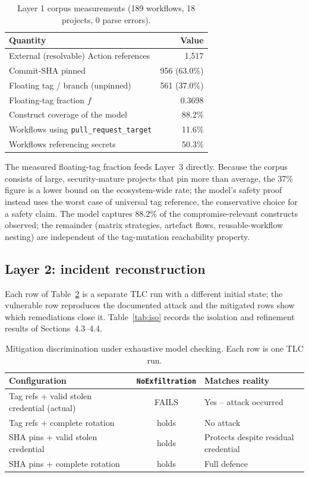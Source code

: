 \documentclass[letterpaper,twocolumn,10pt]{article}
\newcommand{\code}[1]{\texttt{\small #1}}
\begin{document}
\begin{table}[t]\centering
\caption{Layer 1 corpus measurements (189 workflows, 18 projects, 0 parse errors).}\label{tab:corpus}
\small
\begin{tabular}{@{}lr@{}}
\toprule
Quantity & Value\\
\midrule
External (resolvable) Action references & 1{,}517\\
Commit-SHA pinned & 956 (63.0\%)\\
Floating tag / branch (unpinned) & 561 (37.0\%)\\
Floating-tag fraction $f$ & 0.3698\\
Construct coverage of the model & 88.2\%\\
Workflows using \code{pull\_request\_target} & 11.6\%\\
Workflows referencing secrets & 50.3\%\\
\bottomrule
\end{tabular}
\end{table}

The measured floating-tag fraction feeds Layer~3 directly. Because the corpus consists of large, security-mature projects that pin more than average, the 37\% figure is a lower bound on the ecosystem-wide rate; the model's safety proof instead uses the worst case of universal tag reference, the conservative choice for a safety claim. The model captures 88.2\% of the compromise-relevant constructs observed; the remainder (matrix strategies, artefact flows, reusable-workflow nesting) are independent of the tag-mutation reachability property.

\subsection{Layer 2: incident reconstruction}
Each row of Table~\ref{tab:mitig} is a separate TLC run with a different initial state; the vulnerable row reproduces the documented attack and the mitigated rows show which remediations close it. Table~\ref{tab:iso} records the isolation and refinement results of Sections~4.3--4.4.

\begin{table}[t]\centering
\caption{Mitigation discrimination under exhaustive model checking. Each row is one TLC run.}\label{tab:mitig}
\begin{tabular}{@{}lcl@{}}
\toprule
Configuration & \code{NoExfiltration} & Matches reality\\
\midrule
Tag refs + valid stolen credential (actual) & FAILS & Yes -- attack occurred\\
Tag refs + complete rotation & holds & No attack\\
SHA pins + valid stolen credential & holds & Protects despite residual credential\\
SHA pins + complete rotation & holds & Full defence\\
\bottomrule
\end{tabular}
\end{table}
\end{document}
